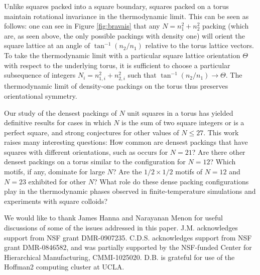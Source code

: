\documentclass[aps]{revtex4}
\begin{document}
Unlike squares packed into a square boundary, squares packed on a torus maintain rotational invariance in the thermodynamic limit.  This can be seen as follows: one can see in Figure \ref{fig:bravais} that any $N=n_1^2+n_2^2$ packing (which are, as seen above, the only possible packings with density one) will orient the square lattice at an angle of $\tan^{-1}(n_2/n_1)$ relative to the torus lattice vectors.  To take the thermodynamic limit with a particular square lattice orientation $\Theta$ with respect to the underlying torus, it is sufficient to choose a particular subsequence of integers $N_i=n_{1,i}^2+n_{2,i}^2$ such that 
$\tan^{-1}(n_2/n_1) \rightarrow \Theta$.
The thermodynamic limit of density-one packings on the torus thus preserves orientational symmetry.


Our study of the densest packings of $N$ unit squares in a torus has yielded definitive results for cases in which $N$ is the sum of two square integers or is a perfect square, and strong conjectures for other values of $N \le 27$.  This work raises many interesting questions: How common are densest packings that have squares with different orientations, such as occurs for $N=21$?  Are there other densest packings on a torus similar to the configuration for $N=12$?  Which motifs, if any, dominate for large $N$?  Are the $1/2 \times 1/2$ motifs of $N=12$ and $N=23$ exhibited for other $N$? What role do these dense packing configurations play in the thermodynamic phases observed in finite-temperature simulations and experiments with square colloids?


\begin{acknowledgements}
We would like to thank James Hanna and Narayanan Menon for useful discussions of some of the issues addressed in this paper.  J.M. acknowledges support from NSF grant DMR-0907235. C.D.S. acknowledges support from NSF grant DMR-0846582, and was partially supported by the NSF-funded Center for Hierarchical Manufacturing, CMMI-1025020. D.B. is grateful for use of the Hoffman2 computing cluster at UCLA.
\end{acknowledgements}
\end{document}
